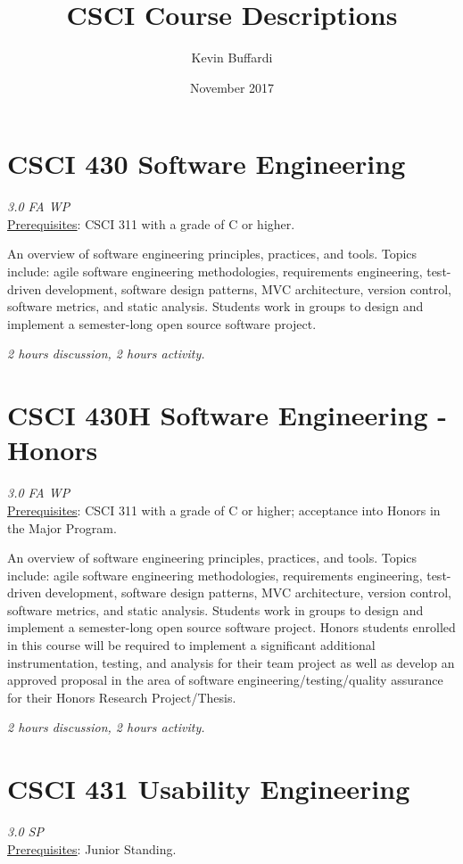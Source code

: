 \documentclass[12pt]{article}
\title{CSCI Course Descriptions}
\author{Kevin Buffardi}
\date{November 2017}
\begin{document}
  \maketitle
  \section*{CSCI 430 Software Engineering}	 	
  \textit{3.0 FA WP} \\
  \underline{Prerequisites}: CSCI 311 with a grade of C or higher.

  An overview of software engineering principles, practices, and tools. Topics include: agile software engineering methodologies, requirements engineering, test-driven development, software design patterns, MVC architecture, version control, software metrics, and static analysis. Students work in groups to design and implement a semester-long open source software project. 

  \textit{2 hours discussion, 2 hours activity.}

  \section*{CSCI 430H Software Engineering - Honors}    
  \textit{3.0 FA WP} \\
  \underline{Prerequisites}: CSCI 311 with a grade of C or higher; acceptance into Honors in the Major Program.

  An overview of software engineering principles, practices, and tools. Topics include: agile software engineering methodologies, requirements engineering, test-driven development, software design patterns, MVC architecture, version control, software metrics, and static analysis. Students work in groups to design and implement a semester-long open source software project. Honors students enrolled in this course will be required to implement a significant additional instrumentation, testing, and analysis for their team project as well as develop an approved proposal in the area of software engineering/testing/quality assurance for their Honors Research Project/Thesis.

  \textit{2 hours discussion, 2 hours activity.}
  
  \section*{CSCI 431 Usability Engineering}
  \textit{3.0 SP} \\
  \underline{Prerequisites}: Junior Standing.
\end{document}

